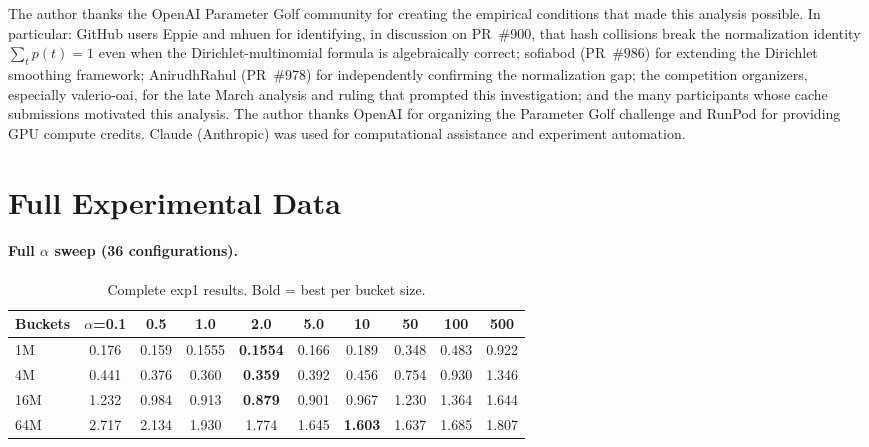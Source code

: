 \documentclass[11pt]{article}
\begin{document}
The author thanks the OpenAI Parameter Golf community for creating the empirical conditions that made this analysis possible. In particular: GitHub users Eppie and mhuen for identifying, in discussion on PR~\#900, that hash collisions break the normalization identity $\sum_t p(t) = 1$ even when the Dirichlet-multinomial formula is algebraically correct; sofiabod (PR~\#986) for extending the Dirichlet smoothing framework; AnirudhRahul (PR~\#978) for independently confirming the normalization gap; the competition organizers, especially valerio-oai, for the late March analysis and ruling that prompted this investigation; and the many participants whose cache submissions motivated this analysis. The author thanks OpenAI for organizing the Parameter Golf challenge and RunPod for providing GPU compute credits. Claude (Anthropic) was used for computational assistance and experiment automation.




\appendix

\section{Full Experimental Data}
\label{app:full_data}

\paragraph{Full $\alpha$ sweep (36 configurations).}

\begin{table}[h]
\centering
\small
\caption{Complete exp1 results. Bold = best per bucket size.}
\label{tab:full_sweep}
\begin{tabular}{l|ccccccccc}
\toprule
Buckets & $\alpha$=0.1 & 0.5 & 1.0 & 2.0 & 5.0 & 10 & 50 & 100 & 500 \\
\midrule
1M & 0.176 & 0.159 & 0.1555 & \textbf{0.1554} & 0.166 & 0.189 & 0.348 & 0.483 & 0.922 \\
4M & 0.441 & 0.376 & 0.360 & \textbf{0.359} & 0.392 & 0.456 & 0.754 & 0.930 & 1.346 \\
16M & 1.232 & 0.984 & 0.913 & \textbf{0.879} & 0.901 & 0.967 & 1.230 & 1.364 & 1.644 \\
64M & 2.717 & 2.134 & 1.930 & 1.774 & 1.645 & \textbf{1.603} & 1.637 & 1.685 & 1.807 \\
\bottomrule
\end{tabular}
\end{table}
\end{document}
